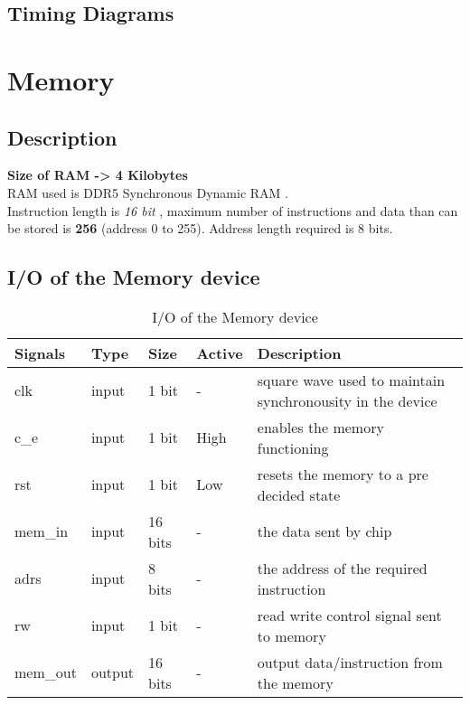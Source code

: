 \documentclass[11pt]{article}
\begin{document}
\subsection{Timing Diagrams}

\section{Memory}
\subsection{Description}
{\bf Size of RAM -> 4 Kilobytes} \\
RAM used is DDR5 Synchronous Dynamic RAM . \\
Instruction length is \textit{16 bit} , maximum number of instructions  and data than can be stored is {\bf 256} (address 0 to 255).
Address length required is 8 bits.
\subsection{I/O of the  Memory device}

\begin{table}[H]
  \begin{center}
    \caption{I/O of the Memory device}
    \begin{tabular}{||l|l|l|l|l||}
      \hline
      {\bf Signals} & { \bf Type } & {\bf Size} & {\bf Active} &{\bf Description}   \\ \hline
            clk            & input  & 1 bit   & -     &  square wave used to maintain synchronousity in the device \\ \hline
            c\_e           & input  & 1 bit   & High  &  enables the memory functioning  \\ \hline
            rst            & input  & 1 bit   & Low   &  resets the memory to a pre decided state \\ \hline
            [15:0] mem\_in & input  & 16 bits & -     &  the data sent by chip \\ \hline
            [7:0] adrs     & input  & 8 bits  & -     &  the address of the required instruction \\ \hline
            rw             & input  & 1 bit   & -     &  read write control signal sent to memory \\ \hline
            [15:0] mem\_out& output & 16 bits & -     &  output data/instruction from the memory \\ \hline
    \end{tabular}
  \end{center}
\end{table}
\end{document}
